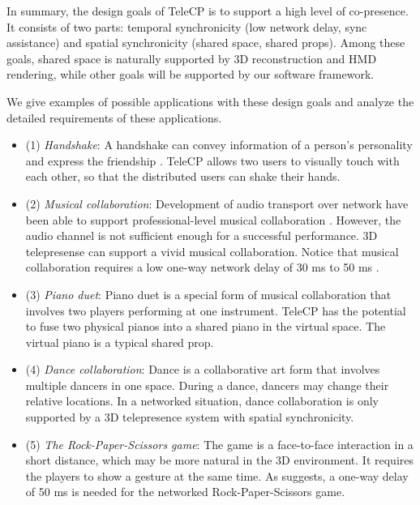 
In summary, the design goals of TeleCP is to support a high level of co-presence. It consists of two parts: temporal synchronicity (low network delay, sync assistance) and spatial synchronicity (shared space, shared props). Among these goals, shared space is naturally supported by 3D reconstruction and HMD rendering, while other goals will be supported by our software framework.

We give examples of possible applications with these design goals and analyze the detailed requirements of these applications.

\begin{itemize}
    \item (1) \emph{Handshake}: A handshake can convey information of a person’s personality \cite{chaplin2000handshaking} and express the friendship \cite{bardeen1970interpersonal}. TeleCP allows two users to visually touch with each other, so that the distributed users can shake their hands.

    \item (2) \emph{Musical collaboration}: Development of audio transport over network have been able to support professional-level musical collaboration \cite{carot2007networked, carot2007network}. However, the audio channel is not sufficient enough for a successful performance. 3D telepresense can support a vivid musical collaboration. Notice that musical collaboration requires a low one-way network delay of 30 ms to 50 ms \cite{schuett2002effects}.
    
    \item (3) \emph{Piano duet}: Piano duet is a special form of musical collaboration that involves two players performing at one instrument. TeleCP has the potential to fuse two physical pianos into a shared piano in the virtual space. The virtual piano is a typical shared prop.
    
    \item (4) \emph{Dance collaboration}: Dance is a collaborative art form that involves multiple dancers in one space. During a dance, dancers may change their relative locations. In a networked situation, dance collaboration is only supported by a 3D telepresence system with spatial synchronicity.
    
    \item (5) \emph{The Rock-Paper-Scissors game}: The game is a face-to-face interaction in a short distance, which may be more natural in the 3D environment. It requires the players to show a gesture at the same time. As \cite{hashimoto2006influences} suggests, a one-way delay of 50 ms is needed for the networked Rock-Paper-Scissors game.
    

\end{itemize}
